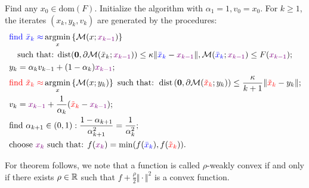 \documentclass[12pt]{article}
\begin{document}
    \begin{definition}\label{def:basic-4wd-catalyst}
        Find any $x_0 \in \text{dom}(F)$. 
        Initialize the algorithm with $\alpha_1 = 1, v_0 = x_0$. 
        For $k \ge 1$, the iterates $(x_k, y_k, v_k)$ are generated by the procedures: 
        \vspace{-0.5em}
        \begin{align*}
            &
            \textcolor{blue}{
                \text{find } \bar x_k \approx 
            }
            \mathop{\rm argmin}\limits_{x}\left\lbrace
                    \mathcal M(x; \textcolor{violet}{x_{k - 1}})
                \right\rbrace
            \\ &\quad 
            \text{such that: }
                \text{dist}(\mathbf 0, \partial \mathcal M(\bar x_k; \textcolor{violet}{x_{k - 1}})) 
                \le 
                \kappa\Vert \textcolor{blue}{\bar x_k}- \textcolor{violet}{x_{k - 1}}\Vert, 
                \mathcal M(\textcolor{blue}{\bar x_k}; \textcolor{violet}{x_{k - 1}}) 
                \le F(\textcolor{violet}{x_{k - 1}}); 
            \\
            & y_k = \alpha_k v_{k - 1} + (1 - \alpha_k) \textcolor{violet}{x_{k - 1}};
            \\
            & 
            \textcolor{red}{\text{find }\tilde x_k \approx}
            \mathop{\rm argmin}\limits_{x} \left\lbrace
                \mathcal M(x; y_k) 
            \right\rbrace
            \text{ such that: }
                \operatorname{dist}\left(
                    \mathbf 0, \partial \mathcal M(\textcolor{red}{\tilde x_k}; y_k)
                \right) 
                \le \frac{\kappa}{k + 1}\Vert \textcolor{red}{\tilde x_k} - y_k\Vert
            ;
            \\
            & v_{k} = \textcolor{violet}{x_{k - 1}} + \frac{1}{\alpha_k}(
                    \textcolor{red}{\tilde x_k} - \textcolor{violet}{x_{k - 1}}
                );
            \\
            & 
            \text{find } \alpha_{k + 1} \in (0, 1): 
            \frac{1 - \alpha_{k + 1}}{\alpha_{k + 1}^2} = \frac{1}{\alpha_k^2};
            \\
            & \text{choose } \textcolor{violet}{x_k} \text{ such that:  } 
            f(\textcolor{violet}{x_k}) = \min(f(\textcolor{blue}{\bar x_k}), f(\textcolor{red}{\tilde x_k})). 
        \end{align*}
    \end{definition}
    For theorem follows, we note that a function is called $\rho$-weakly convex if and only if there exists $\rho \in \mathbb R$ such that $f + \frac{\rho}{2}\Vert \cdot\Vert^2$ is a convex function. 
\end{document}
